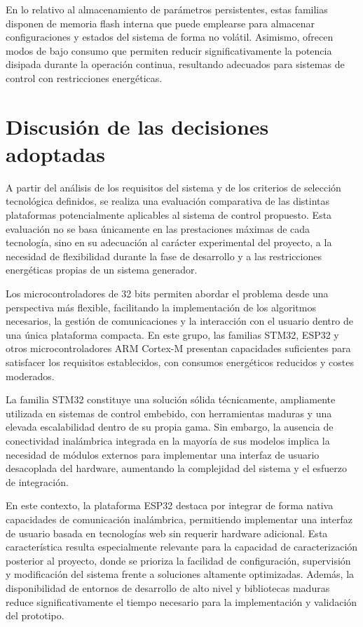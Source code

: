 En lo relativo al almacenamiento de parámetros persistentes, estas familias disponen de memoria flash interna que puede emplearse para almacenar configuraciones y estados del sistema de forma no volátil. Asimismo, ofrecen modos de bajo consumo que permiten reducir significativamente la potencia disipada durante la operación continua, resultando adecuados para sistemas de control con restricciones energéticas.


\section{Discusión de las decisiones adoptadas}

A partir del análisis de los requisitos del sistema y de los criterios de selección tecnológica definidos, se realiza una evaluación comparativa de las distintas plataformas potencialmente aplicables al sistema de control propuesto. Esta evaluación no se basa únicamente en las prestaciones máximas de cada tecnología, sino en su adecuación al carácter experimental del proyecto, a la necesidad de flexibilidad durante la fase de desarrollo y a las restricciones energéticas propias de un sistema generador.

Los microcontroladores de 32 bits permiten abordar el problema desde una perspectiva más flexible, facilitando la implementación de los algoritmos necesarios, la gestión de comunicaciones y la interacción con el usuario dentro de una única plataforma compacta. En este grupo, las familias STM32, ESP32 y otros microcontroladores ARM Cortex-M presentan capacidades suficientes para satisfacer los requisitos establecidos, con consumos energéticos reducidos y costes moderados.

La familia STM32 constituye una solución sólida técnicamente, ampliamente utilizada en sistemas de control embebido, con herramientas maduras y una elevada escalabilidad dentro de su propia gama. Sin embargo, la ausencia de conectividad inalámbrica integrada en la mayoría de sus modelos implica la necesidad de módulos externos para implementar una interfaz de usuario desacoplada del hardware, aumentando la complejidad del sistema y el esfuerzo de integración.

En este contexto, la plataforma ESP32 destaca por integrar de forma nativa capacidades de comunicación inalámbrica, permitiendo implementar una interfaz de usuario basada en tecnologías web sin requerir hardware adicional. Esta característica resulta especialmente relevante para la capacidad de caracterización posterior al proyecto, donde se prioriza la facilidad de configuración, supervisión y modificación del sistema frente a soluciones altamente optimizadas. Además, la disponibilidad de entornos de desarrollo de alto nivel y bibliotecas maduras reduce significativamente el tiempo necesario para la implementación y validación del prototipo.

